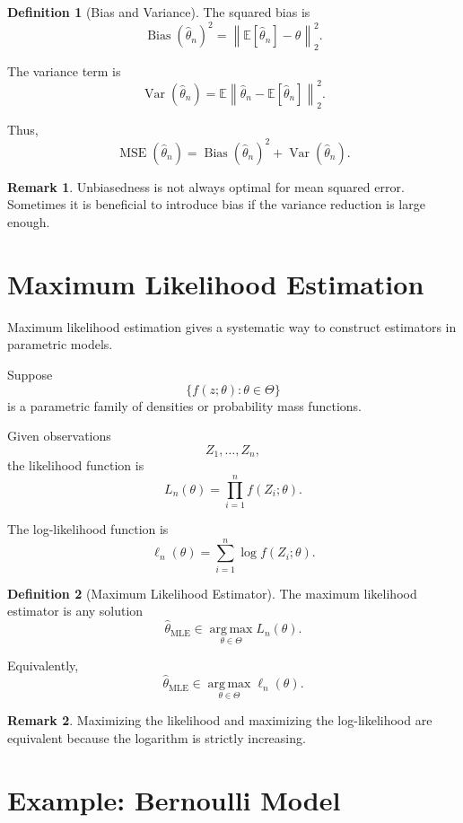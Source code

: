 \documentclass[12pt,oneside]{book}
\numberwithin{equation}{section}
\theoremstyle{definition}
\newtheorem{definition}{Definition}[section]
\newtheorem{remark}{Remark}[section]
\theoremstyle{plain}
\theoremstyle{remark}
\newcommand{\E}{\mathbb{E}}
\newcommand{\argmax}{\operatorname*{arg\,max}}
\newcommand{\norm}[1]{\left\lVert #1 \right\rVert}
\begin{document}
\begin{definition}[Bias and Variance]
The squared bias is
\[
\operatorname{Bias}(\widehat{\theta}_n)^2
=
\norm{\E[\widehat{\theta}_n]-\theta}_2^2.
\]

The variance term is
\[
\operatorname{Var}(\widehat{\theta}_n)
=
\E\norm{\widehat{\theta}_n-\E[\widehat{\theta}_n]}_2^2.
\]

Thus,
\[
\operatorname{MSE}(\widehat{\theta}_n)
=
\operatorname{Bias}(\widehat{\theta}_n)^2
+
\operatorname{Var}(\widehat{\theta}_n).
\]
\end{definition}

\begin{remark}
Unbiasedness is not always optimal for mean squared error. Sometimes it is beneficial to introduce bias if the variance reduction is large enough.
\end{remark}

\section{Maximum Likelihood Estimation}

Maximum likelihood estimation gives a systematic way to construct estimators in parametric models.

Suppose
\[
\{f(z;\theta):\theta\in\Theta\}
\]
is a parametric family of densities or probability mass functions.

Given observations
\[
Z_1,\dots,Z_n,
\]
the likelihood function is
\[
L_n(\theta)
=
\prod_{i=1}^n f(Z_i;\theta).
\]

The log-likelihood function is
\[
\ell_n(\theta)
=
\sum_{i=1}^n \log f(Z_i;\theta).
\]

\begin{definition}[Maximum Likelihood Estimator]
The maximum likelihood estimator is any solution
\[
\widehat{\theta}_{\mathrm{MLE}}
\in
\argmax_{\theta\in\Theta} L_n(\theta).
\]

Equivalently,
\[
\widehat{\theta}_{\mathrm{MLE}}
\in
\argmax_{\theta\in\Theta} \ell_n(\theta).
\]
\end{definition}

\begin{remark}
Maximizing the likelihood and maximizing the log-likelihood are equivalent because the logarithm is strictly increasing.
\end{remark}

\section{Example: Bernoulli Model}
\end{document}
